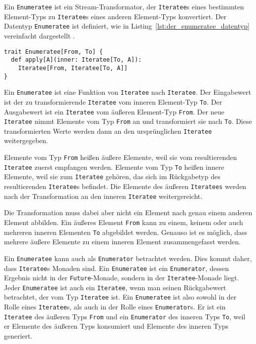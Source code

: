 Ein \lstinline|Enumeratee| ist ein Stream-Transformator, der \lstinline|Iteratee|s eines bestimmten Element-Typs zu \lstinline|Iteratee|s eines anderen Element-Typs konvertiert.
Der Datentyp \lstinline|Enumeratee| ist definiert, wie in Listing~\ref{lst:der_enumeratee_datentyp} vereinfacht dargestellt \cite[vgl.][]{play_enumeratee_source_code}.
\begin{lstlisting}[caption=Der Enumeratee-Datentyp, label=lst:der_enumeratee_datentyp]
trait Enumeratee[From, To] {
  def apply[A](inner: Iteratee[To, A]):
    Iteratee[From, Iteratee[To, A]]
}
\end{lstlisting}

Ein \lstinline|Enumeratee| ist eine Funktion von \lstinline|Iteratee| nach \lstinline|Iteratee|.
Der Eingabewert ist der zu transformierende \lstinline|Iteratee| vom inneren Element-Typ \lstinline|To|.
Der Ausgabewert ist ein \lstinline|Iteratee| vom äußeren Element-Typ \lstinline|From|.
Der neue \lstinline|Iteratee| nimmt Elemente vom Typ \lstinline|From| an und transformiert sie nach \lstinline|To|.
Diese transformierten Werte werden dann an den ursprünglichen \lstinline|Iteratee| weitergegeben.

Elemente vom Typ \lstinline|From| heißen äußere Elemente, weil sie vom resultierenden \lstinline|Iteratee| zuerst empfangen werden.
Elemente vom Typ \lstinline|To| heißen innere Elemente, weil sie zum \lstinline|Iteratee| gehören, das sich im Rückgabetyp des resultierenden \lstinline|Iteratee|s befindet.
Die Elemente des äußeren \lstinline|Iteratees| werden nach der Transformation an den inneren \lstinline|Iteratee| weitergereicht.

Die Transformation muss dabei aber nicht ein Element nach genau einem anderen Element abbilden.
Ein äußeres Element \lstinline|From| kann zu einem, keinem oder auch mehreren inneren Elementen \lstinline|To| abgebildet werden.
Genauso ist es möglich, dass mehrere äußere Elemente zu einem inneren Element zusammengefasst werden.

\begin{sloppypar} %
Ein \lstinline|Enumeratee| kann auch als \lstinline|Enumerator| betrachtet werden.
Dies kommt daher, dass \lstinline|Iteratee|s Monaden sind.
Ein \lstinline|Enumeratee| ist ein \lstinline|Enumerator|, dessen Ergebnis nicht in der \lstinline|Future|-Monade, sondern in der \lstinline|Iteratee|-Monade liegt.
Jeder \lstinline|Enumeratee| ist auch ein \lstinline|Iteratee|, wenn man seinen Rückgabewert betrachtet, der vom Typ \lstinline|Iteratee| ist.
Ein \lstinline|Enumeratee| ist also sowohl in der Rolle eines \lstinline|Iteratee|s, als auch in der Rolle eines \lstinline|Enumerator|s.
Er ist ein \lstinline|Iteratee| des äußeren Typs \lstinline|From| und ein \lstinline|Enumerator| des inneren Typs \lstinline|To|, weil er Elemente des äußeren Typs konsumiert und Elemente des inneren Typs generiert.
\end{sloppypar}

